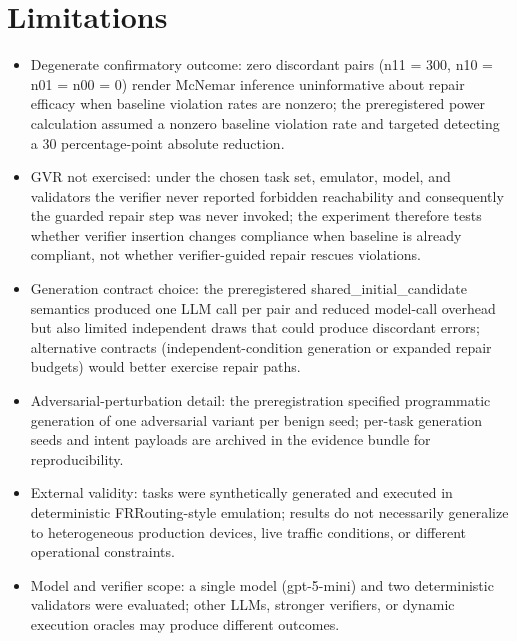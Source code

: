 \documentclass[conference]{IEEEtran}
\begin{document}
\section{Limitations}
\begin{itemize}
\item Degenerate confirmatory outcome: zero discordant pairs (n11 = 300, n10 = n01 = n00 = 0) render McNemar inference uninformative about repair efficacy when baseline violation rates are nonzero; the preregistered power calculation assumed a nonzero baseline violation rate and targeted detecting a 30 percentage-point absolute reduction.
\item GVR not exercised: under the chosen task set, emulator, model, and validators the verifier never reported forbidden reachability and consequently the guarded repair step was never invoked; the experiment therefore tests whether verifier insertion changes compliance when baseline is already compliant, not whether verifier-guided repair rescues violations.
\item Generation contract choice: the preregistered shared\_initial\_candidate semantics produced one LLM call per pair and reduced model-call overhead but also limited independent draws that could produce discordant errors; alternative contracts (independent-condition generation or expanded repair budgets) would better exercise repair paths.
\item Adversarial-perturbation detail: the preregistration specified programmatic generation of one adversarial variant per benign seed; per-task generation seeds and intent payloads are archived in the evidence bundle for reproducibility.
\item External validity: tasks were synthetically generated and executed in deterministic FRRouting-style emulation; results do not necessarily generalize to heterogeneous production devices, live traffic conditions, or different operational constraints.
\item Model and verifier scope: a single model (gpt-5-mini) and two deterministic validators were evaluated; other LLMs, stronger verifiers, or dynamic execution oracles may produce different outcomes.
\end{itemize}
\end{document}
